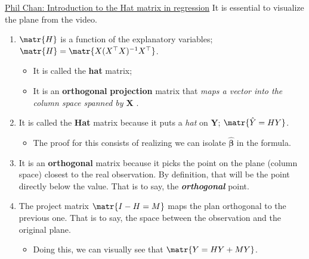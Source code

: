 \documentclass[12pt, titlepage, french]{report}
\begin{document}
\begin{YTB_SUMM}{\href{https://www.youtube.com/watch?v=Z-jXJpVohiI}{Phil Chan: Introduction to the Hat matrix in regression}}
It is essential to visualize the plane from the video.
\begin{enumerate}
	\item	$\matr{H}$ is a function of the explanatory variables; $\matr{H} = \matr{X(X^{\top}X)^{-1}X^{\top}}$.
	\begin{itemize}
		\item	It is called the \textbf{hat} matrix;
		\item	It is an \textbf{orthogonal} \textbf{projection} matrix that \og \textit{maps a vector into the column space spanned by $\bm{X}$} \fg{}.
	\end{itemize}
	\item	It is called the \textbf{Hat} matrix because it puts a \textit{hat} on $\bm{Y}$; $\matr{\hat{Y} = H Y}$.
	\begin{itemize}
		\item	The proof for this consists of realizing we can isolate $\bm{\hat{\beta}}$ in the formula.
	\end{itemize}
	\item	It is an \textbf{orthogonal} matrix because it picks the point on the plane (column space) closest to the real observation. By definition, that will be the point directly below the value. That is to say, the \textit{\textbf{orthogonal}} point.
	\item	The project matrix $\matr{I - H = M}$ maps the plan orthogonal to the previous one. That is to say, the space between the observation and the original plane.
	\begin{itemize}
		\item	Doing this, we can visually see that $\matr{Y = HY + MY}$.
	\end{itemize}
\end{enumerate}
\end{YTB_SUMM}
\end{document}
